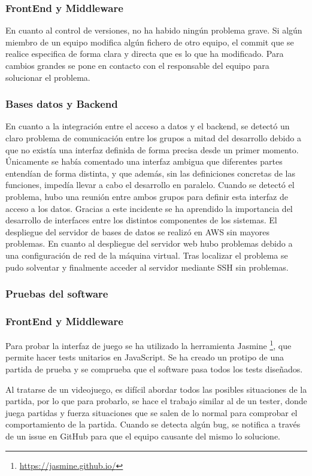 \subsubsection*{FrontEnd y Middleware}
En cuanto al control de versiones, no ha habido ningún problema grave. Si algún miembro de un equipo modifica algún fichero de otro equipo, el commit que se realice especifica de forma clara y directa que es lo que ha modificado. Para cambios grandes se pone en contacto con el responsable del equipo para solucionar el problema.
\subsubsection*{Bases datos y Backend}
En cuanto a la integración entre el acceso a datos y el backend, se detectó un claro problema de comunicación entre los grupos a mitad del desarrollo debido a que no existía una interfaz definida de forma precisa desde un primer momento. Únicamente se había comentado una interfaz ambigua que diferentes partes entendían de forma distinta, y que además, sin las definiciones concretas de las funciones, impedía llevar a cabo el desarrollo en paralelo. Cuando se detectó el problema, hubo una reunión entre ambos grupos para definir esta interfaz de acceso a los datos. Gracias a este incidente se ha aprendido la importancia del desarrollo de interfaces entre los distintos componentes de los sistemas.
El despliegue del servidor de bases de datos se realizó en AWS sin mayores problemas. En cuanto al despliegue del servidor web hubo problemas debido a una configuración de red de la máquina virtual. Tras localizar el problema se pudo solventar y finalmente acceder al servidor mediante SSH sin problemas.
\subsubsection{Pruebas del software}
\subsubsection*{FrontEnd y Middleware}
Para probar la interfaz de juego se ha utilizado la herramienta Jasmine \footnote{ \url{https://jasmine.github.io/} }, que permite hacer tests unitarios en JavaScript. Se ha creado un protipo de una partida de prueba y se comprueba que el software pasa todos los tests diseñados.

Al tratarse de un videojuego, es difícil abordar todos las posibles situaciones de la partida, por lo que para probarlo, se hace el trabajo similar al de un tester, donde juega partidas y fuerza situaciones que se salen de lo normal para comprobar el comportamiento de la partida. Cuando se detecta algún bug, se notifica a través de un issue en GitHub para que el equipo causante del mismo lo solucione.

